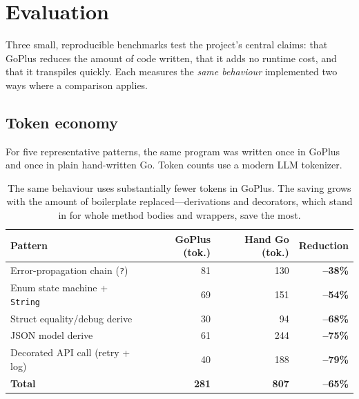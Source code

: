 \documentclass[11pt,a4paper]{article}
\begin{document}
\section{Evaluation}\label{sec:eval}
Three small, reproducible benchmarks test the project's central claims: that
GoPlus reduces the amount of code written, that it adds no runtime cost, and that
it transpiles quickly. Each measures the \emph{same behaviour} implemented two
ways where a comparison applies.

\subsection{Token economy}
For five representative patterns, the same program was written once in GoPlus
and once in plain hand-written Go. Token counts use a modern LLM tokenizer.

\begin{table}[h]
\centering
\renewcommand{\arraystretch}{1.2}
\begin{tabularx}{\textwidth}{@{}X r r r@{}}
\toprule
\textbf{Pattern} & \textbf{GoPlus (tok.)} & \textbf{Hand Go (tok.)} & \textbf{Reduction} \\
\midrule
Error-propagation chain (\texttt{?})     &  81 & 130 & \textbf{--38\%} \\
Enum state machine + \texttt{String}     &  69 & 151 & \textbf{--54\%} \\
Struct equality/debug derive             &  30 &  94 & \textbf{--68\%} \\
JSON model derive                        &  61 & 244 & \textbf{--75\%} \\
Decorated API call (retry + log)         &  40 & 188 & \textbf{--79\%} \\
\midrule
\textbf{Total}                           & \textbf{281} & \textbf{807} & \textbf{--65\%} \\
\bottomrule
\end{tabularx}
\caption{The same behaviour uses substantially fewer tokens in GoPlus. The saving
grows with the amount of boilerplate replaced---derivations and decorators, which
stand in for whole method bodies and wrappers, save the most.}
\end{table}
\end{document}
